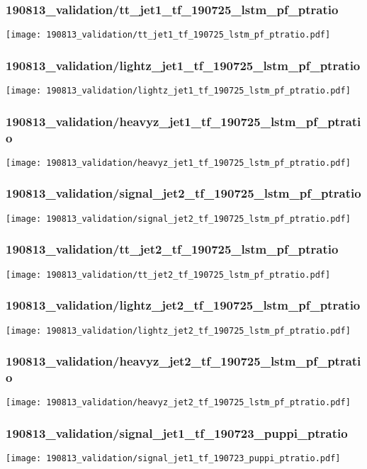 \begin{frame}
   \frametitle{\small 190813\_validation/tt\_jet1\_tf\_190725\_lstm\_pf\_ptratio}
   \centering
   \texttt{[image: 190813\_validation/tt\_jet1\_tf\_190725\_lstm\_pf\_ptratio.pdf]}
\end{frame}

\begin{frame}
   \frametitle{\small 190813\_validation/lightz\_jet1\_tf\_190725\_lstm\_pf\_ptratio}
   \centering
   \texttt{[image: 190813\_validation/lightz\_jet1\_tf\_190725\_lstm\_pf\_ptratio.pdf]}
\end{frame}

\begin{frame}
   \frametitle{\small 190813\_validation/heavyz\_jet1\_tf\_190725\_lstm\_pf\_ptratio}
   \centering
   \texttt{[image: 190813\_validation/heavyz\_jet1\_tf\_190725\_lstm\_pf\_ptratio.pdf]}
\end{frame}

\begin{frame}
   \frametitle{\small 190813\_validation/signal\_jet2\_tf\_190725\_lstm\_pf\_ptratio}
   \centering
   \texttt{[image: 190813\_validation/signal\_jet2\_tf\_190725\_lstm\_pf\_ptratio.pdf]}
\end{frame}

\begin{frame}
   \frametitle{\small 190813\_validation/tt\_jet2\_tf\_190725\_lstm\_pf\_ptratio}
   \centering
   \texttt{[image: 190813\_validation/tt\_jet2\_tf\_190725\_lstm\_pf\_ptratio.pdf]}
\end{frame}

\begin{frame}
   \frametitle{\small 190813\_validation/lightz\_jet2\_tf\_190725\_lstm\_pf\_ptratio}
   \centering
   \texttt{[image: 190813\_validation/lightz\_jet2\_tf\_190725\_lstm\_pf\_ptratio.pdf]}
\end{frame}

\begin{frame}
   \frametitle{\small 190813\_validation/heavyz\_jet2\_tf\_190725\_lstm\_pf\_ptratio}
   \centering
   \texttt{[image: 190813\_validation/heavyz\_jet2\_tf\_190725\_lstm\_pf\_ptratio.pdf]}
\end{frame}

\begin{frame}
   \frametitle{\small 190813\_validation/signal\_jet1\_tf\_190723\_puppi\_ptratio}
   \centering
   \texttt{[image: 190813\_validation/signal\_jet1\_tf\_190723\_puppi\_ptratio.pdf]}
\end{frame}

